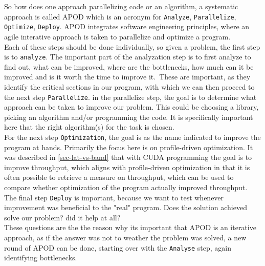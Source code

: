 So how does one approach parallelizing code or an algorithm, a systematic approach is called APOD which is an acronym for \texttt{Analyze}, \texttt{Parallelize}, \texttt{Optimize}, \texttt{Deploy}. APOD integrates software engineering principles, where an agile interative approach is taken to parallelize and optimize a program.\\
Each of these steps should be done individually, so given a problem, the first step is to \texttt{analyze}. The important part of the analyzation step is to first analyze to find out, what can be improved, where are the bottlenecks, how much can it be improved and is it worth the time to improve it.\
These are important, as they identify the critical sections in our program, with which we can then proceed to the next step \texttt{Parallelize}. in the parallelize step, the goal is to determine what approach can be taken to improve our problem. This could be choosing a library, picking an algorithm and/or programming the code. It is specifically important here that the right algorithm(s) for the task is chosen.\\
For the next step \texttt{Optimization}, the goal is as the name indicated to improve the program at hands. Primarily the focus here is on profile-driven optimization. It was described in \cref{sec-lat-vs-band} that with CUDA programming the goal is to improve throughput, which aligns with profile-driven optimization in that it is often possible to retrieve a measure on throughput, which can be used to compare whether optimization of the program actually improved throughput.\\
The final step \texttt{Deploy} is important, because we want to test whenever improvement was beneficial to the "real" program. Does the solution achieved solve our problem? did it help at all?\\ These questions are the the reason why its important that APOD is an iterative approach, as if the answer was not to weather the problem was solved, a new round of APOD can be done, starting over with the \texttt{Analyse} step, again identifying bottlenecks. 
	